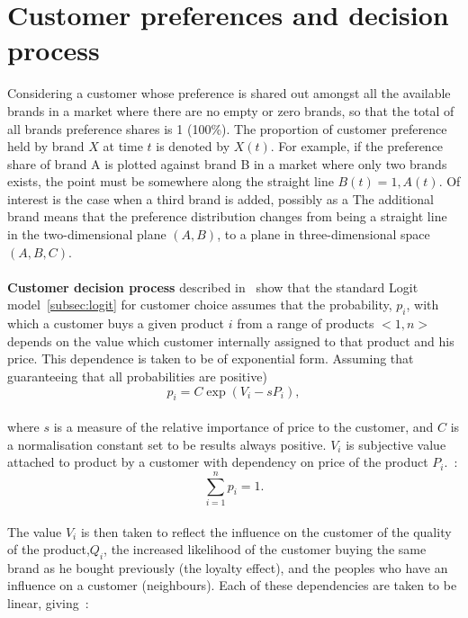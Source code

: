 \section{Customer preferences and decision process} \label{sec:customer_preferences}
Considering a customer whose preference is shared out amongst all the available brands in a market where there are no empty or zero brands,
so that the total of all brands preference shares is 1 (100\%).
The proportion of customer preference held by brand $X$ at time $t$ is denoted by $X(t)$.
For example, if the preference share of brand A is plotted against brand B in a market where only two brands exists,
the point must be somewhere along the straight line $B(t) = 1, A(t)$.
Of interest is the case when a third brand is added, possibly as a
The additional brand means that the preference distribution changes from being a straight line in the two-dimensional plane $(A, B)$,
to a plane in three-dimensional space $(A, B, C)$.\\
\\
\textbf{Customer decision process} \label{sec:cus_decision} described in~\cite{patel} show that the standard Logit model~\ref{subsec:logit} for customer choice assumes that
the probability, $p_i$, with which a customer buys a given product $i$ from a range of products $<1, n>$ depends on
the value which customer internally assigned to that product and his price.
This dependence is taken to be of exponential form.
Assuming that guaranteeing that all probabilities are positive)
\\
\begin{equation} \label{eq:9}
p_i = C\exp(V_i - sP_i),
\end{equation}
\\
where $s$ is a measure of the relative importance of price to the customer, and $C$ is a normalisation constant set to be results always positive. $V_i$ is subjective value
attached to product by a customer with dependency on price of the product $P_i$.~\cite{patel}:
\\
\begin{equation} \label{eq:10}
\sum_{i=1}^n p_i = 1.
\end{equation}
\\
The value $V_i$ is then taken to reflect the influence on the customer of the quality of the product,$Q_i$,
the increased likelihood of the customer buying the same brand as he bought previously (the loyalty effect),
and the peoples who have an influence on a customer (neighbours).
Each of these dependencies are taken to be linear, giving~\cite{patel}:

